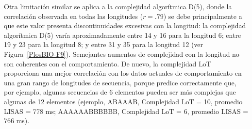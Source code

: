 Otra limitación similar se aplica a la complejidad algorítmica D(5), donde la correlación observada en todas las longitudes ($r = .79$) se debe principalmente a que este valor presenta discontinuidades excesivas con la longitud: la complejidad algorítmica D(5) varía aproximadamente entre 14 y 16 para la longitud 6; entre 19 y 23 para la longitud 8; y entre 31 y 35 para la longitud 12 (ver Figura~\ref{PlosBIO-F9}). Semejantes aumentos de complejidad con la longitud no son coherentes con el comportamiento. De nuevo, la complejidad LoT proporciona una mejor correlación con los datos actuales de comportamiento en una gran rango de longitudes de secuencia, porque predice correctamente que, por ejemplo, algunas secuencias de 6 elementos pueden ser más complejas que algunas de 12 elementos (ejemplo, ABAAAB, Complejidad LoT = 10, promedio LISAS = 778 ms; AAAAAABBBBBB, Complejidad LoT = 6, promedio LISAS = 766 ms).

